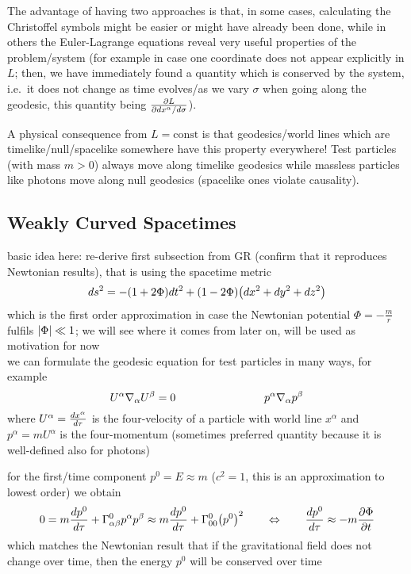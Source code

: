 The advantage of having two approaches is that, in some cases, calculating the Christoffel symbols might be easier or might have already been done, while in others the Euler-Lagrange equations reveal very useful properties of the problem/system (for example in case one coordinate does not appear explicitly in $L$; then, we have immediately found a quantity which is conserved by the system, i.e.~it does not change as time evolves/as we vary $\sigma$ when going along the geodesic, this quantity being $\pdv{L}{dx^\alpha / d\sigma}$).

A physical consequence from $L = \text{const}$ is that geodesics/world lines which are timelike/null/spacelike somewhere have this property everywhere! Test particles (with mass $m > 0$) always move along timelike geodesics while massless particles like photons move along null geodesics (spacelike ones violate causality).



		\subsection{Weakly Curved Spacetimes}
basic idea here: re-derive first subsection from GR (confirm that it reproduces Newtonian results), that is using the spacetime metric
\begin{equation}
ds^2 = - \qty(1 + 2 \Phi) dt^2 + \qty(1 - 2\Phi) \qty(dx^2 + dy^2 + dz^2)
\end{equation}
which is the first order approximation in case the Newtonian potential $\Phi = - \frac{m}{r}$ fulfils $\abs{\Phi} \ll 1$; we will see where it comes from later on, will be used as motivation for now\\


we can formulate the geodesic equation for test particles in many ways, for example
\begin{equation}
U^\alpha \nabla_\alpha U^\beta = 0 \qquad \qquad \qquad \qquad p^\alpha \nabla_\alpha p^\beta
\end{equation}
where $U^\alpha = \dv{x^\alpha}{\tau}$ is the four-velocity of a particle with world line $x^\alpha$ and $p^\alpha = m U^\alpha$ is the four-momentum (sometimes preferred quantity because it is well-defined also for photons)

for the first/time component $p^0 = E \approx m$ ($c^2 = 1$, this is an approximation to lowest order) we obtain
\begin{equation}
0 = m \dv{p^0}{\tau} + \Gamma^0_{\alpha \beta} p^\alpha p^\beta \approx m \dv{p^0}{\tau} + \Gamma^0_{0 0} \qty(p^0)^2 \qquad \Leftrightarrow \qquad \dv{p^0}{\tau} \approx - m \pdv{\Phi}{t}
\end{equation}
which matches the Newtonian result that if the gravitational field does not change over time, then the energy $p^0$ will be conserved over time

